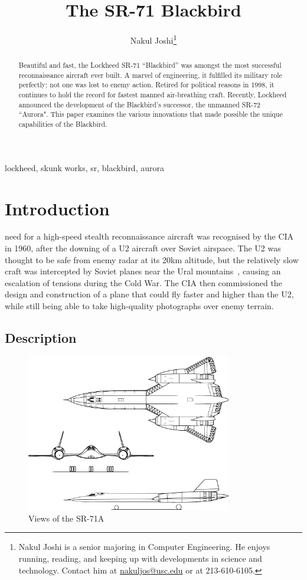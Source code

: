 \documentclass[12pt, draftclsnofoot, onecolumn]{IEEEtran}
\title{The SR-71 Blackbird}
\author{Nakul Joshi\thanks{
	Nakul Joshi is a senior majoring in Computer Engineering. He enjoys running, reading, and keeping up with developments in science and technology. Contact him at \href{mailto:nakuljos@usc.edu}{nakuljos@usc.edu} or at 213-610-6105.
}}
\begin{document}
\maketitle

\begin{abstract}
	Beautiful and fast, the Lockheed SR-71 ``Blackbird'' was amongst the most successful reconnaissance aircraft ever built. A marvel of engineering, it fulfilled its military role perfectly: not one was lost to enemy action. Retired for political reasons in 1998, it continues to hold the record for fastest manned air-breathing craft. Recently, Lockheed announced the development of the Blackbird's successor, the unmanned SR-72 ``Aurora". This paper examines the various innovations that made possible the unique capabilities of the Blackbird.
\end{abstract}

\begin{IEEEkeywords} lockheed, skunk works, sr, blackbird, aurora \end{IEEEkeywords}



\section{Introduction}

	 need for a high-speed stealth reconnaissance aircraft was recognised by the CIA in 1960, after the downing of a U2 aircraft over Soviet airspace. The U2 was thought to be safe from enemy radar at its 20km altitude, but the relatively slow craft was intercepted by Soviet planes near the Ural mountains~\cite{u2}, causing an escalation of tensions during the Cold War. The CIA then commissioned the design and construction of a plane that could fly faster and higher than the U2, while still being able to take high-quality photographs over enemy terrain.	
	
	\subsection*{Description}

	\begin{figure}[h]
		\centering
		\includegraphics[width=0.8\textwidth]{view.pdf}
		\caption{Views of the SR-71A}
	\end{figure}
\end{document}
